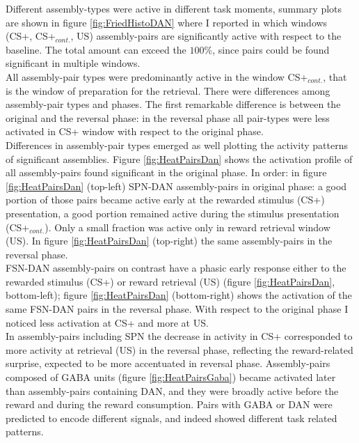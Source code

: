 Different assembly-types were active in different task moments, summary plots are shown in figure \ref{fig:FriedHistoDAN} where I reported in which windows (CS+, CS+$_{cont.}$, US) assembly-pairs are significantly active with respect to the baseline. The total amount can exceed the $100\%$, since pairs could be found significant in multiple windows.\\All assembly-pair types were predominantly active in the window CS+$_{cont.}$, that is the window of preparation for the retrieval. There were differences among assembly-pair types and phases. The first remarkable difference is between the original and the reversal phase: in the reversal phase all pair-types were less activated in CS+ window with respect to the original phase.\\Differences in assembly-pair types emerged as well plotting the activity patterns of significant assemblies. Figure \ref{fig:HeatPairsDan} shows the activation profile of all assembly-pairs found significant in the original phase. In order: in figure \ref{fig:HeatPairsDan} (top-left) SPN-DAN assembly-pairs in original phase: a good portion of those pairs became active early at the rewarded stimulus (CS+) presentation, a good portion remained active during the stimulus presentation (CS+$_{cont.}$). Only a small fraction was active only in reward retrieval window (US). In figure \ref{fig:HeatPairsDan} (top-right) the same assembly-pairs in the reversal phase.\\FSN-DAN assembly-pairs on contrast have a phasic early response either to the rewarded stimulus (CS+) or reward retrieval (US) (figure \ref{fig:HeatPairsDan}, bottom-left); figure \ref{fig:HeatPairsDan} (bottom-right) shows the activation of the same FSN-DAN pairs in the reversal phase. With respect to the original phase I noticed less activation at CS+ and more at US.\\In assembly-pairs including SPN the decrease in activity in CS+ corresponded to more activity at retrieval (US) in the reversal phase, reflecting the reward-related surprise, expected to be more accentuated in reversal phase. Assembly-pairs composed of GABA units (figure \ref{fig:HeatPairsGaba}) became activated later than assembly-pairs containing DAN, and they were broadly active before the reward and during the reward consumption. Pairs with GABA or DAN were predicted to encode different signals, and indeed showed different task related patterns.
